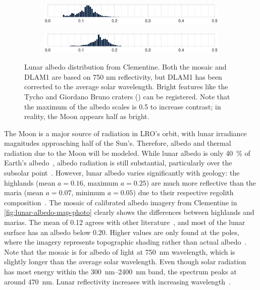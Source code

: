 \begin{figure}[t]
    \begin{subfigure}[c]{0.49\textwidth}
        \includegraphics[width=\textwidth]{figures/plots/lunar_hist_photo.pdf}
    \end{subfigure}
   \hfill
    \begin{subfigure}[c]{0.49\textwidth}
        \includegraphics[width=\textwidth]{figures/plots/lunar_hist_dlam1.pdf}
    \end{subfigure}

   \caption{Lunar albedo distribution from Clementine. Both the mosaic and \acrshort{DLAM1} are based on 750 nm reflectivity, but \acrshort{DLAM1} has been corrected to the average solar wavelength. Bright features like the Tycho and Giordano Bruno craters (\textcolor{mpl-pink}{}) can be registered. Note that the maximum of the albedo scales is 0.5 to increase contrast; in reality, the Moon appears half as bright.}
   \label{fig:lunar-albedo-map}
\end{figure}

The Moon is a major source of radiation in \gls{LRO}'s orbit, with lunar irradiance magnitudes approaching half of the Sun's. Therefore, albedo and thermal radiation due to the Moon will be modeled. While lunar albedo is only \qty{40}{\percent} of Earth's albedo~\cite{Goode2001}, albedo radiation is still substantial, particularly over the subsolar point~\cite{Floberghagen1999}. However, lunar albedo varies significantly with geology: the highlands (mean $a = 0.16$, maximum $a=0.25$) are much more reflective than the maria (mean $a = 0.07$, minimum $a = 0.05$) due to their respective regolith composition~\cite{Vasavada2012,Hayne2017,Sato2014}. The mosaic of calibrated albedo imagery from Clementine in \cref{fig:lunar-albedo-map-photo} clearly shows the differences between highlands and marias. The mean of 0.12 agrees with other literature~\cite{Vasavada2012}, and most of the lunar surface has an albedo below 0.20. Higher values are only found at the poles, where the imagery represents topographic shading rather than actual albedo~\cite{McEwen1997}. Note that the mosaic is for albedo of light at \qty{750}{\nm} wavelength, which is slightly longer than the average solar wavelength. Even though solar radiation has most energy within the \qtyrange{300}{2400}{\nm} band, the spectrum peaks at around \qty{470}{\nm}. Lunar reflectivity increases with increasing wavelength~\cite{Shkuratov2011}.


